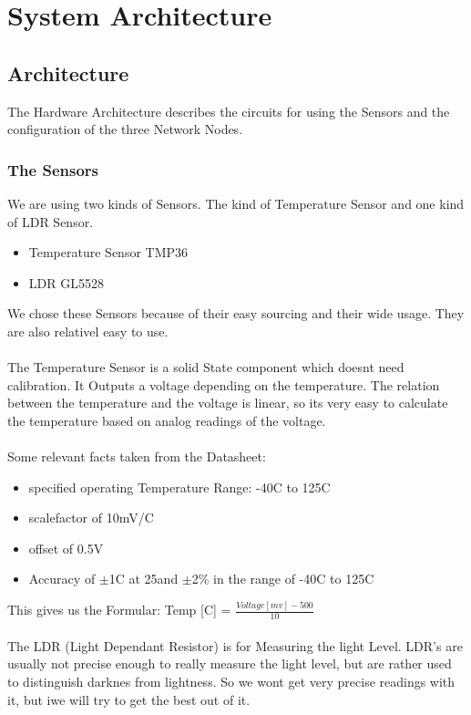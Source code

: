 \documentclass[
	11pt,
	a4paper
]{article}%
\begin{document}
\section{System Architecture}
\subsection{Architecture}
The Hardware Architecture describes the circuits for using the Sensors and the configuration of the three Network Nodes.

\subsubsection{The Sensors}
We are using two kinds of Sensors. The kind of Temperature Sensor and one kind of LDR Sensor.
\begin{itemize}
\item Temperature Sensor TMP36
\item LDR GL5528
\end{itemize}
We chose these Sensors because of their easy sourcing and their wide usage. They are also relativel easy to use.
\\\\
The Temperature Sensor is a solid State component which doesnt need calibration. It Outputs a voltage depending on the temperature. The relation between the temperature and the voltage is linear, so its very easy to calculate the temperature based on analog readings of the voltage.
\\\\
Some relevant facts taken from the Datasheet:
\begin{itemize}
\item specified operating Temperature Range: -40\degree C to 125\degree C
\item scalefactor of 10mV/\degree C
\item offset of 0.5V
\item Accuracy of $\pm$1\degree C at 25\degree  and $\pm$2\% in the range of -40\degree C to 125\degree C
\end{itemize}
This gives us the Formular: Temp [\degree C] = \textbf{$\frac{Voltage [mv] -500}{10}$}
\\\\
The LDR (Light Dependant Resistor) is for Measuring the light Level. LDR's are usually not precise enough to really measure the light level, but are rather used to distinguish darknes from lightness. So we wont get very precise readings with it, but iwe will try to get the best out of it.
\end{document}
